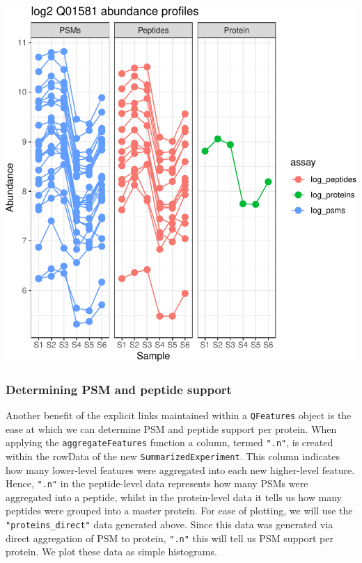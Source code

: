 \documentclass[9pt,a4paper,]{extarticle}
\begin{document}
\begin{center}\includegraphics[width=0.8\linewidth]{workflow_expressions_files/figure-latex/qfeatures_links_plots-1} \end{center}

\subsubsection{Determining PSM and peptide support}\label{determining-psm-and-peptide-support}

Another benefit of the explicit links maintained within a \texttt{QFeatures} object is
the ease at which we can determine PSM and peptide support per protein. When
applying the \texttt{aggregateFeatures} function a column, termed \texttt{".n"}, is created
within the rowData of the new \texttt{SummarizedExperiment}. This column indicates how
many lower-level features were aggregated into each new higher-level feature.
Hence, \texttt{".n"} in the peptide-level data represents how many PSMs were aggregated
into a peptide, whilst in the protein-level data it tells us how many peptides
were grouped into a master protein. For ease of plotting, we will use the
\texttt{"proteins\_direct"} data generated above. Since this data was generated via
direct aggregation of PSM to protein, \texttt{".n"} this will tell us PSM support per
protein. We plot these data as simple histograms.
\end{document}
